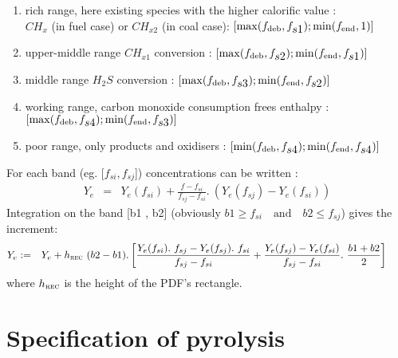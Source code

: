 \begin{enumerate}
\item rich range, here existing species with the higher calorific value : \\
  \hspace{0.25cm}$CH_{x}$ (in fuel case) or $CH_{x2}$ (in coal case):
  $[\max(f_{\mbox{\scriptsize deb}},f_{\displaystyle s1}) ;
  \min(f_{\mbox{\scriptsize end}},1)]$
\item upper-middle range $CH_{x1}$ conversion : $[\max(f_{\mbox{\scriptsize
      deb}},f_{\displaystyle s2} ); \min (f_{\mbox{\scriptsize
      end}},f_{\displaystyle s1})]$
\item middle range $H_{2}S$ conversion : $[\max(f_{\mbox{\scriptsize
      deb}},f_{\displaystyle s3} ); \min (f_{\mbox{\scriptsize
      end}},f_{\displaystyle s2})]$
\item working range, carbon monoxide consumption frees enthalpy :
  $[\max(f_{\mbox{\scriptsize deb}},f_{\displaystyle s4} ); \min
  (f_{\mbox{\scriptsize end}},f_{\displaystyle s3})]$
\item poor range, only products and oxidisers : $[\min(f_{\mbox{\scriptsize
      deb}},f_{\displaystyle s4} ); \min (f_{\mbox{\scriptsize
      end}},f_{\displaystyle s4})]$
\end{enumerate}
For each band (eg. [$f_{\displaystyle si} , f_{\displaystyle sj}$])
concentrations can be written :
\begin{eqnarray}
  \displaystyle Y_e & = & Y_{e}(f_{\displaystyle si}) + \frac{f-f_{\displaystyle si}}{f_{\displaystyle sj}-f_{\displaystyle si}} .~ \left( Y_{e}(f_{\displaystyle sj})-Y_{e}(f_{\displaystyle si}) \right) 
\end{eqnarray}
Integration on the band [b1 , b2] (obviously $b1 \geq f_{si} \quad \text{and}
\quad b2 \leq f_{sj}$) gives the increment:
\begin{eqnarray}
  \displaystyle Y_{e} & := & Y_e + h_{\mbox{\scriptsize \textsc{rec}}}~(b2-b1)  .  \left[ \frac{Y_{e}(f_{si}).~f_{sj}-Y_{e}(f_{sj}).~f_{si}}{f_{sj}-f_{si}}
    \displaystyle                                  +         \frac{Y_{e}(f_{sj})-Y_{e}(f_{si})}{f_{sj}-f_{si}}.~\frac{b1+b2}{2} \right] \qquad
\end{eqnarray}
where $h_{\mbox{\scriptsize \textsc{rec}}}$ is the height of the PDF's
rectangle.

\section*{Specification of pyrolysis}

